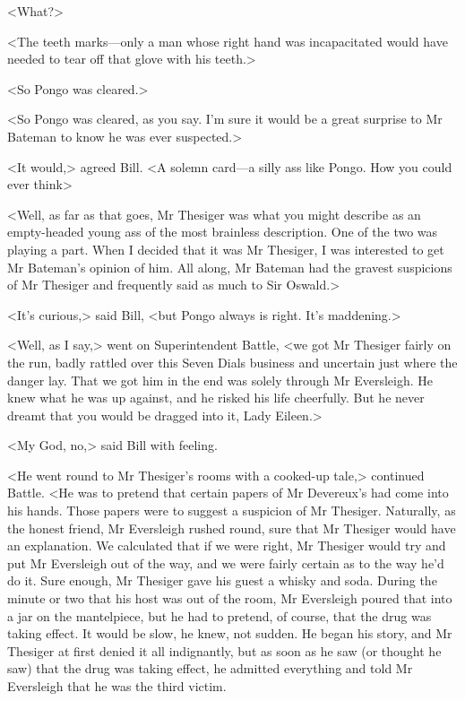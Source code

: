 <What?>

<The teeth marks—only a man whose right hand was incapacitated would have needed to tear off that glove with his teeth.>

<So Pongo was cleared.>

<So Pongo was cleared, as you say. I'm sure it would be a great surprise to Mr Bateman to know he was ever suspected.>

<It would,> agreed Bill. <A solemn card—a silly ass like Pongo. How you could ever think\longdash>

<Well, as far as that goes, Mr Thesiger was what you might describe as an empty-headed young ass of the most brainless description. One of the two was playing a part. When I decided that it was Mr Thesiger, I was interested to get Mr Bateman's opinion of him. All along, Mr Bateman had the gravest suspicions of Mr Thesiger and frequently said as much to Sir Oswald.>

<It's curious,> said Bill, <but Pongo always is right. It's maddening.>

<Well, as I say,> went on Superintendent Battle, <we got Mr Thesiger fairly on the run, badly rattled over this Seven Dials business and uncertain just where the danger lay. That we got him in the end was solely through Mr Eversleigh. He knew what he was up against, and he risked his life cheerfully. But he never dreamt that you would be dragged into it, Lady Eileen.>

<My God, no,> said Bill with feeling.

<He went round to Mr Thesiger's rooms with a cooked-up tale,> continued Battle. <He was to pretend that certain papers of Mr Devereux's had come into his hands. Those papers were to suggest a suspicion of Mr Thesiger. Naturally, as the honest friend, Mr Eversleigh rushed round, sure that Mr Thesiger would have an explanation. We calculated that if we were right, Mr Thesiger would try and put Mr Eversleigh out of the way, and we were fairly certain as to the way he'd do it. Sure enough, Mr Thesiger gave his guest a whisky and soda. During the minute or two that his host was out of the room, Mr Eversleigh poured that into a jar on the mantelpiece, but he had to pretend, of course, that the drug was taking effect. It would be slow, he knew, not sudden. He began his story, and Mr Thesiger at first denied it all indignantly, but as soon as he saw (or thought he saw) that the drug was taking effect, he admitted everything and told Mr Eversleigh that he was the third victim.

